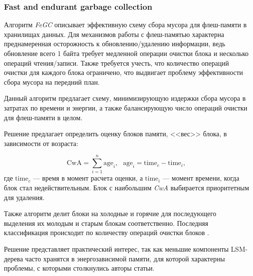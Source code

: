 \subsubsection{Fast and endurant garbage collection}
\label{FeGC}
Алгоритм \textit{FeGC} описывает эффективную схему сбора мусора для флеш-памяти
в хранилищах данных. Для механизмов работы с флеш-памятью характерна преднамеренная
осторожность к обновлению/удалению информации, ведь обновление всего 1 байта требует
медленной операции очистки блока и несколько операций чтения/записи. Также требуется
учесть, что количество операций очистки для каждого блока ограничено, что выдвигает
проблему эффективности сбора мусора на передний план.

Данный алгоритм предлагает схему, минимизирующую издержки сбора мусора в затратах
по времени и энергии, а также балансирующую число операций очистки для флеш-памяти
в целом.

Решение предлагает определить оценку блоков памяти, <<вес>> блока, в зависимости
от возраста:

\begin{equation}
    \text{CwA} = \sum_{i=1}^n \text{age}_i, \text{      }
    \text{age}_i = \text{time}_c - \text{time}_i,
\end{equation}
где $\text{time}_c$ — время в момент расчета оценки, а $\text{time}_i$ — момент
времени, когда блок стал недействительным. Блок с наибольшим \textit{CwA}
выбирается приоритетным для удаления.

Также алгоритм делит блоки на холодные и горячие для последующего выделения их
молодым и старым блокам соответственно. Последняя классификация происходит по
количеству операций очистки блоков \cite{FeGC:2011}\cite{FeGC:2014}.

Решение представляет практический интерес, так как меньшие компоненты LSM-дерева
часто хранятся в энергозависимой памяти, для которой характерны проблемы, с
которыми столкнулись авторы статьи.